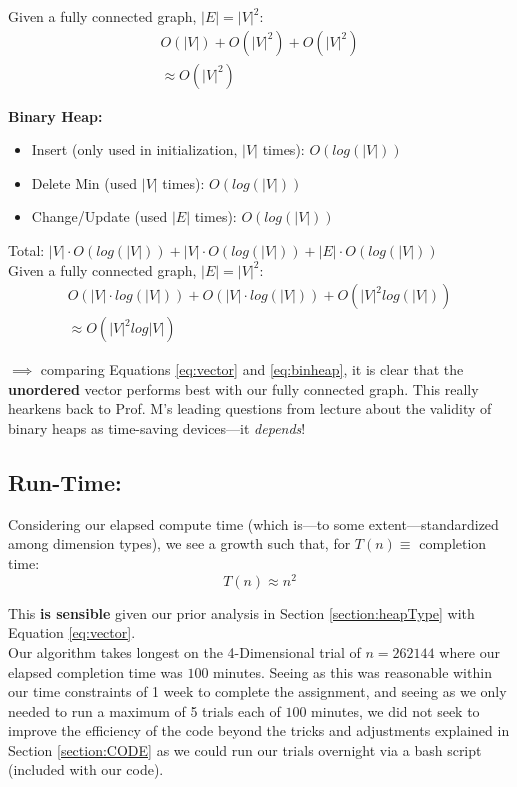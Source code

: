 \documentclass[conference]{styles/acmsiggraph}
\newcommand{\?}{\stackrel{?}{=}}
\begin{document}
Given a fully connected graph, $|E| = |V|^2$:
\begin{align}
    O(|V|) + O(|V|^2) + O(|V|^2)\\
    \approx O(|V|^2) \label{eq:vector}
\end{align}



\textbf{Binary Heap:}
\begin{itemize}
    \item Insert (only used in initialization, $|V|$ times): $O(log(|V|))$
    \item Delete Min (used $|V|$ times): $O(log(|V|))$
    \item Change/Update (used $|E|$ times): $O(log(|V|))$
\end{itemize}
Total: $|V| \cdot O(log(|V|)) + |V| \cdot O(log(|V|)) + |E| \cdot O(log(|V|))$\\

Given a fully connected graph, $|E| = |V|^2$:
\begin{align}
    O(|V| \cdot log(|V|)) + O(|V| \cdot log(|V|)) + O(|V|^2 log(|V|))\\
    \approx O(|V|^2 log|V|) \label{eq:binheap}
\end{align}

$\implies$ comparing Equations \ref{eq:vector} and \ref{eq:binheap}, it is clear that the \textbf{unordered} vector performs best with our fully connected graph.  This really hearkens back to Prof. M's leading questions from lecture about the validity of binary heaps as time-saving devices---it \textit{depends}!

\subsection{Run-Time:} \label{section:RUNTIME}
Considering our elapsed compute time (which is---to some extent---standardized among dimension types), we see a growth such that, for $T(n) \equiv$ completion time:
$$T(n) \approx n^2$$

This \textbf{is sensible} given our prior analysis in Section \ref{section:heapType} with Equation \ref{eq:vector}.\\

Our algorithm takes longest on the 4-Dimensional trial of $n=262144$ where our elapsed completion time was $100$ minutes.  Seeing as this was reasonable within our time constraints of 1 week to complete the assignment, and seeing as we only needed to run a maximum of 5 trials each of $100$ minutes, we did not seek to improve the efficiency of the code beyond the tricks and adjustments explained in Section \ref{section:CODE} as we could run our trials overnight via a bash script (included with our code).
\end{document}
